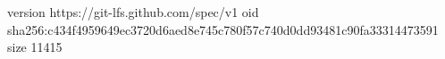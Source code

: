 version https://git-lfs.github.com/spec/v1
oid sha256:c434f4959649ec3720d6aed8e745c780f57c740d0dd93481c90fa33314473591
size 11415
